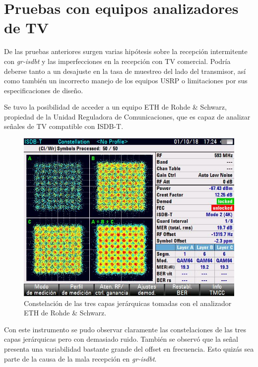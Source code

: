 \section{Pruebas con equipos analizadores de TV}

De las pruebas anteriores surgen varias hipótesis sobre la recepción intermitente con \textit{gr-isdbt} y las imperfecciones en la recepción con TV comercial. Podría deberse tanto a un desajuste en la tasa de muestreo del lado del transmisor, así como también un incorrecto manejo de los equipos USRP o limitaciones por sus especificaciones de diseño.

Se tuvo la posibilidad de acceder a un equipo ETH de Rohde \& Schwarz, propiedad de la Unidad Reguladora de Comunicaciones, que es capaz de analizar señales de TV compatible con ISDB-T. 

\begin{figure}[!h]
	\centering
	\includegraphics[scale=0.6]{figuras/cap06/constelacion_eth}
	\caption{\label{f:calidad_imagen} Constelación de las tres capas jerárquicas tomadas con el analizador ETH de Rohde \& Schwarz.}
\end{figure}

Con este instrumento se pudo observar claramente las constelaciones de las tres capas jerárquicas pero con demasiado ruido. También se observó que la señal presenta una variabilidad bastante grande del offset en frecuencia. Esto quizás sea parte de la causa de la mala recepción en \textit{gr-isdbt}.

